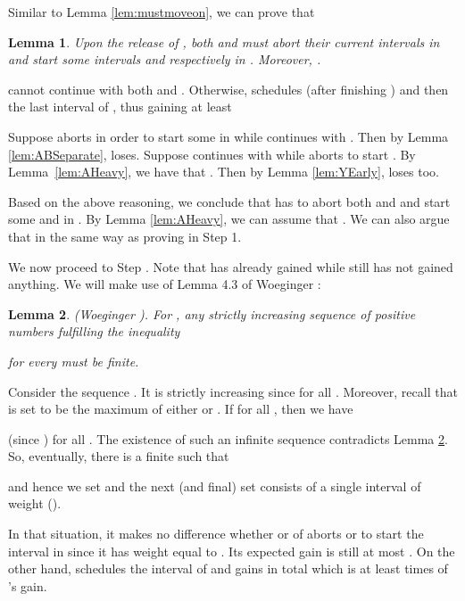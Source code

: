 \documentclass[11pt]{article}
\newtheorem{lemma}{Lemma}[section]
\newcommand{\qed}{\hspace*{\fill}\par\medskip}
\newenvironment{proof}{\noindent{\it Proof. }\ignorespaces}{\qed}
\begin{document}
Similar to Lemma \ref{lem:mustmoveon}, we can prove that

\begin{lemma} 
Upon the release of ,
both  and  must abort their current intervals in 
and start some intervals  and  respectively in .
Moreover, .
\end{lemma}

\begin{proof}
 cannot continue with both  and .
Otherwise,  schedules (after finishing )
 and then the last interval of ,
thus gaining at least


Suppose  aborts  in order to start some  in  
while  continues with .
Then by Lemma \ref{lem:ABSeparate},  loses.
Suppose  continues with  while
 aborts  to start .
By Lemma~\ref{lem:AHeavy}, we have that .
Then by Lemma \ref{lem:YEarly},  loses too.

Based on the above reasoning, we conclude that  has to abort
both  and  and start some  and  in .
By Lemma \ref{lem:AHeavy}, we can assume that .
We can also argue that  in the same way as proving
 in Step 1.
\end{proof}

We now proceed to Step .
Note that  has already gained
 while  still has not gained anything.
We will make use of Lemma 4.3 of Woeginger \cite{Woeg94}:

\begin{lemma} \label{lem:woeg}
(Woeginger \cite{Woeg94}).
For , any strictly increasing sequence of positive
numbers  fulfilling
the inequality
  
for every  must be finite.
\end{lemma} 

Consider the sequence .
It is strictly increasing since  for all .
Moreover, recall that  is set to be the maximum of either
 or .
If 
for all ,
then we have 




(since ) for all .
The existence of such an infinite sequence contradicts Lemma \ref{lem:woeg}.
So, eventually, there is a finite  such that 

and hence we set  and the next (and final)
set  consists of a single interval of weight 
().

In that situation, it makes no difference whether  or  of 
aborts  or  to start the interval in 
since it has weight equal to .
Its expected gain is still at most .
On the other hand,  schedules the interval of 
and gains in total 
 which is
at least  times of 's gain.
\end{document}
